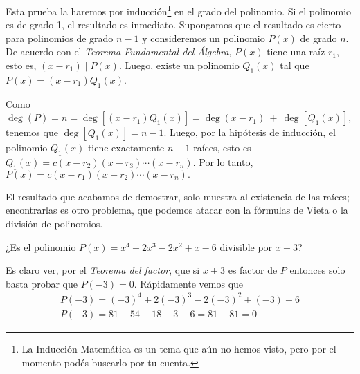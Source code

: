 Esta prueba la haremos por inducción\footnote{La Inducción Matemática es un tema que aún no hemos visto, pero por el momento podés buscarlo por tu cuenta.} en el grado del polinomio.
Si el polinomio es de grado 1, el resultado es inmediato. Supongamos que el resultado es cierto para polinomios de grado $n - 1$ y consideremos un polinomio $P(x)$ de grado $n$.
De acuerdo con el \textit{Teorema Fundamental del Álgebra}, $P(x)$ tiene una raíz $r_1$, esto es, $(x - r_1) \mid P(x)$.
Luego, existe un polinomio $Q_1 (x)$ tal que $P(x) = (x - r_1)Q_1(x)$.

Como $\deg(P) = n = \deg[(x - r_1)Q_1(x)] = \deg(x - r_1)\ +\ \deg[Q_1(x)]$, tenemos que $\deg[Q_1(x)] = n - 1$.
Luego, por la hipótesis de inducción, el polinomio $Q_1(x)$ tiene exactamente $n - 1$ raíces, esto es $Q_1(x) = c(x - r_2)(x - r_3)\cdots(x - r_n)$.
Por lo tanto, $P(x) = c(x - r_1)(x - r_2)\cdots(x - r_n).$

El resultado que acabamos de demostrar, solo muestra al existencia de las raíces; encontrarlas es otro problema, que podemos atacar con la fórmulas de Vieta o la división de polinomios.

\begin{example}
    ¿Es el polinomio $P(x) = x^4 + 2x^3 - 2x^2 + x - 6$ divisible por $x + 3$?

    \solution
    {
        Es claro ver, por el \textit{Teorema del factor}, que si $x + 3$ es factor de $P$ entonces solo basta probar que $P(-3) = 0$.
        Rápidamente vemos que
        \begin{gather*}
            P(-3) = (-3)^4 + 2(-3)^3 - 2(-3)^2 + (-3) - 6\\
            P(-3) = 81 - 54 - 18 - 3 - 6 = 81 - 81 = \boxed{0}
        \end{gather*}
    }
\end{example}

